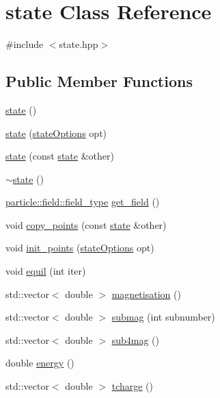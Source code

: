 \hypertarget{classstate}{}\section{state Class Reference}
\label{classstate}


{\ttfamily \#include $<$state.\+hpp$>$}

\subsection*{Public Member Functions}
\begin{DoxyCompactItemize}
\item 
\hyperlink{classstate_aee920d9f534640451f22b3525f9cb9de}{state} ()
\item 
\hyperlink{classstate_aa3dee783102d59b3c07617558c25afaf}{state} (\hyperlink{structstateOptions}{state\+Options} opt)
\item 
\hyperlink{classstate_a285d976cdbd4a9de9ec8d1d887991ecc}{state} (const \hyperlink{classstate}{state} \&other)
\item 
\hyperlink{classstate_a60216b51b01ca0ebe9786ec2da66568f}{$\sim$state} ()
\item 
\hyperlink{classparticle_1_1field_1_1field__type}{particle\+::field\+::field\+\_\+type} \hyperlink{classstate_a0a6f3f9510acca9b766cc4b4f17671c0}{get\+\_\+field} ()
\item 
void \hyperlink{classstate_a0d0ea6448509ececead44d83b4decd1c}{copy\+\_\+points} (const \hyperlink{classstate}{state} \&other)
\item 
void \hyperlink{classstate_aac3b2330539154d3784730e4c8a61123}{init\+\_\+points} (\hyperlink{structstateOptions}{state\+Options} opt)
\item 
void \hyperlink{classstate_af70b6f999313cc427a526388058cb45c}{equil} (int iter)
\item 
std\+::vector$<$ double $>$ \hyperlink{classstate_a5d5980e59b16063808f09eac46d14292}{magnetisation} ()
\item 
std\+::vector$<$ double $>$ \hyperlink{classstate_aff62d62706dc27dde2c3638769c0a00a}{submag} (int subnumber)
\item 
std\+::vector$<$ double $>$ \hyperlink{classstate_a72e85f832afb8ce9b9df34c2c61e546f}{sub4mag} ()
\item 
double \hyperlink{classstate_a6209503f752e5089e0301f103fdf1d1e}{energy} ()
\item 
std\+::vector$<$ double $>$ \hyperlink{classstate_aba4b4f47fc3b9cba97b5f63518214f30}{tcharge} ()

\end{DoxyCompactItemize}
